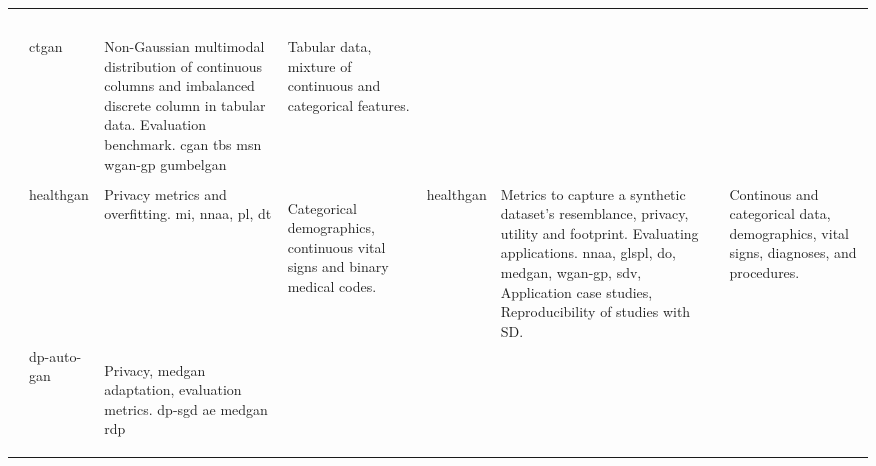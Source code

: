 \begin{sidewaystable}[htbp]
\begin{tabularx}{\textwidth}{@{}p{4cm}XXX@{}}
            
            \cite{Yang_2019_cdss}
            & 
            & 
            &\\
            
            
            \cite{Yang_2019_ehr}
            & 
            & 
            &\\
            
            
            \cite{Yang_2019_impute_ehr}
            & 
            & 
            &\\
            
            \cite{rubanova2019latent}
            & 
            & 
            &\\
            
            \cite{Beaulieu-Jones2019-ct}
            & 
            & 
            &\\
            
            \cite{Xu2019-ay}
            & \gls{ctgan}
            & Non-Gaussian multimodal distribution of continuous columns and imbalanced discrete column in tabular data. Evaluation benchmark. \gls{cgan} \gls{tbs} \gls{msn} \gls{wgan-gp} \gls{gumbelgan}
            & Tabular data, mixture of continuous and categorical features.\\
            
            
            \cite{Zhang2020}
            & 
            & 
            &\\
            
            \cite{yale2019ESANN}
            & \gls{healthgan}
            & Privacy metrics and overfitting. \gls{mi}, \gls{nnaa}, \gls{pl}, \gls{dt}
            & Categorical demographics, continuous vital signs and binary medical codes.
            
            \cite{Yale_2020}
            & \gls{healthgan}
            & Metrics to capture a synthetic dataset’s resemblance, privacy, utility and footprint. Evaluating applications. \gls{nnaa}, gls{pl}, \gls{do}, \gls{medgan}, \gls{wgan-gp}, \gls{sdv}, Application case studies, Reproducibility of studies with \gls{SD}.
            & Continous and categorical data, demographics, vital signs, diagnoses, and procedures.\\
            
            \cite{tanti2019}
            & \gls{dp-auto-gan}
            & Privacy, \gls{medgan} adaptation, evaluation metrics. \gls{dp-sgd} \gls{ae} \gls{medgan} \gls{rdp}
            
            \cite{cui2019conan}
            & 
            & 
            &\\
            

\end{tabularx}
\end{sidewaystable}
